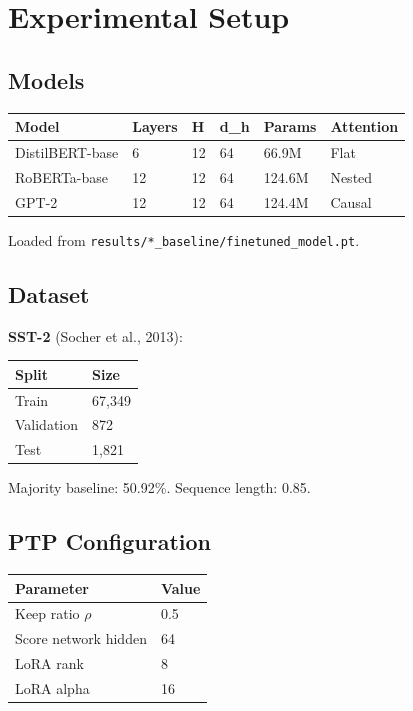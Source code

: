 {\section{Experimental Setup}

\subsection{Models}

\begin{table}[H]
\centering
\small
\begin{tabular}{llllll}
\toprule
\textbf{Model} & \textbf{Layers} & \textbf{H} & \textbf{d\_h} & \textbf{Params} & \textbf{Attention} \\
\midrule
DistilBERT-base & 6 & 12 & 64 & 66.9M & Flat \\
RoBERTa-base & 12 & 12 & 64 & 124.6M & Nested \\
GPT-2 & 12 & 12 & 64 & 124.4M & Causal \\
\bottomrule
\end{tabular}
\end{table}

Loaded from \texttt{results/*\_baseline/finetuned\_model.pt}.

\subsection{Dataset}

\textbf{SST-2} (Socher et al., 2013):

\begin{table}[H]
\centering
\small
\begin{tabular}{ll}
\toprule
\textbf{Split} & \textbf{Size} \\
\midrule
Train & 67,349 \\
Validation & 872 \\
Test & 1,821 \\
\bottomrule
\end{tabular}
\end{table}

Majority baseline: 50.92\%. Sequence length: 0.85.

\subsection{PTP Configuration}

\begin{table}[H]
\centering
\small
\begin{tabular}{ll}
\toprule
\textbf{Parameter} & \textbf{Value} \\
\midrule
Keep ratio $\rho$ & 0.5 \\
Score network hidden & 64 \\
LoRA rank & 8 \\
LoRA alpha & 16 \\
\bottomrule
\end{tabular}
\end{table}

}
